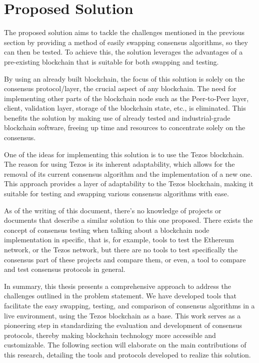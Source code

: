 \section{Proposed Solution}
The proposed solution aims to tackle the challenges mentioned in the previous section by providing a method of easily swapping consensus algorithms, so they can then be tested. To achieve this, the solution leverages the advantages of a pre-existing blockchain that is suitable for both swapping and testing.

By using an already built blockchain, the focus of this solution is solely on the consensus protocol/layer, the crucial aspect of any blockchain. The need for implementing other parts of the blockchain node such as the Peer-to-Peer layer, client, validation layer, storage of the blockchain state, etc., is eliminated. This benefits the solution by making use of already tested and industrial-grade blockchain software, freeing up time and resources to concentrate solely on the consensus.

One of the ideas for implementing this solution is to use the Tezos blockchain. The reason for using Tezos is its inherent adaptability, which allows for the removal of its current consensus algorithm and the implementation of a new one. This approach provides a layer of adaptability to the Tezos blockchain, making it suitable for testing and swapping various consensus algorithms with ease.

As of the writing of this document, there's no knowledge of projects or documents that describe a similar solution to this one proposed. There exists the concept of consensus testing when talking about a blockchain node implementation in specific, that is, for example, tools to test the Ethereum network, or the Tezos network, but there are no tools to test specifically the consensus part of these projects and compare them, or even, a tool to compare and test consensus protocols in general.


In summary, this thesis presents a comprehensive approach to address the challenges outlined in the problem statement. We have developed tools that facilitate the easy swapping, testing, and comparison of consensus algorithms in a live environment, using the Tezos blockchain as a base. This work serves as a pioneering step in standardizing the evaluation and development of consensus protocols, thereby making blockchain technology more accessible and customizable. The following section will elaborate on the main contributions of this research, detailing the tools and protocols developed to realize this solution.



